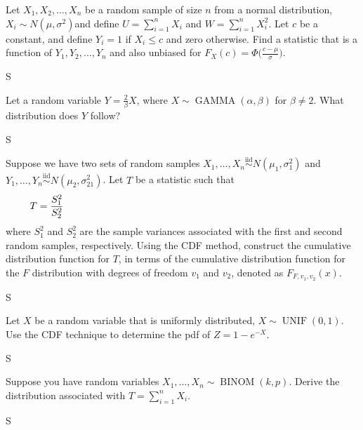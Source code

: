 \documentclass[answers]{exam}
\begin{document}
\begin{questions}
\question 
Let \(X_1,X_2,\ldots,X_n\) be a random sample of size \(n\) from a normal distribution, 
\(X_i \sim N(\mu,\sigma^2)\)and define \(U=\sum_{i=1}^{n}X_i\) and \(W=\sum_{i=1}^{n}X_i^2\). 
Let \(c\) be a constant, and define \(Y_i=1\) if \(X_i\leq c\) and zero otherwise. 
Find a statistic that is a function of \(Y_1,Y_2,\ldots,Y_n\) and also unbiased for 
\(F_X(c)=\Phi\bigg(\frac{c-\mu}{\sigma}\bigg)\).
\begin{solution}
	S
\end{solution}

\question 
Let a random variable \(Y=\frac{2}{\beta}X\), where 
\(X \sim \operatorname{GAMMA}(\alpha,\beta)\) for \(\beta\neq2\). 
What distribution does \(Y\) follow?
\begin{solution}
	S
\end{solution}

\question 
Suppose we have two sets of random samples 
\(X_1,\ldots,X_n \stackrel{\text{iid}}{\sim} N(\mu_1,\sigma_1^2)\) and 
\(Y_1,\ldots,Y_n \stackrel{\text{iid}}{\sim} N(\mu_2,\sigma_21^2)\). 
Let \(T\) be a statistic such that
	\[T = \frac{S_1^2}{S_2^2}  \hspace{0.8\linewidth}\]
where \(S_1^2\) and \(S_2^2\) are the sample variances associated with the first and second random samples, respectively. 
Using the CDF method, construct the cumulative distribution function for \(T\), 
in terms of the cumulative distribution function for the \(F\) distribution 
with degrees of freedom \(v_1\) and \(v_2\), denoted as \(F_{F,v_1,v_2}(x)\).
\begin{solution}
	S
\end{solution}

\question 
Let \(X\) be a random variable that is uniformly distributed, 
\(X\sim\operatorname{UNIF}(0,1)\). 
Use the CDF technique to determine the pdf of \(Z=1-e^{-X}\).
\begin{solution}
	S
\end{solution}

\question 
Suppose you have random variables \(X_1,\ldots,X_n \sim \operatorname{BINOM}(k,p)\). Derive the distribution associated with \(T=\sum_{i=1}^{n}X_i\).
\begin{solution}
	S
\end{solution}

\end{questions}
\end{document}
